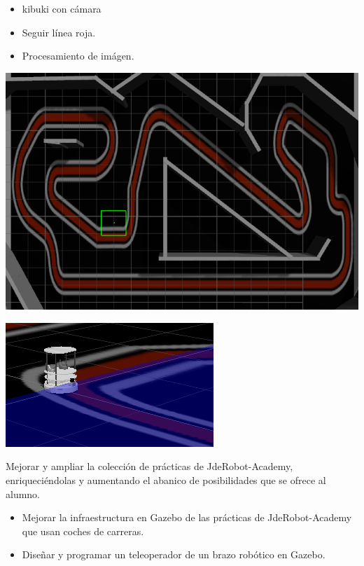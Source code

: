 \documentclass[notes,slidesec,a4]{seminar}
\begin{document}
\begin{hslide}
	\begin{itemize}
		\item kibuki con cámara 
		\item Seguir línea roja.
		\item Procesamiento de imágen.
	\end{itemize}
	\begin{minipage}[t]{0.47\textwidth}
		\includegraphics[width=\textwidth]{followline-world.png}
	\end{minipage}
	\begin{minipage}[t]{0.53\textwidth}
		\includegraphics[width=\textwidth]{kobukiMontmelo.png}
	\end{minipage}
\end{hslide}

\begin{hslide}
	Mejorar y ampliar la colección de prácticas de JdeRobot-Academy, enriqueciéndolas y aumentando el abanico de posibilidades que se ofrece al alumno.
	\begin{itemize}
		\item Mejorar la infraestructura en Gazebo de las prácticas de JdeRobot-Academy que usan coches de carreras.
		\item Diseñar y programar un teleoperador de un brazo robótico en Gazebo.
	\end{itemize}
\end{hslide}
\end{document}
